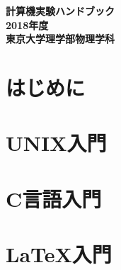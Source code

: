 \documentclass[a4j]{jsbook}
\newcommand{\nendo}{2018}
\begin{document}
\thispagestyle{empty}
\pagestyle{empty}
\begin{titlepage}
\vspace*{5cm}
\begin{center}
{\Huge\bf 計算機実験ハンドブック}\\
\vspace*{14cm}
{\LARGE\bf \nendo 年度}\\
\vspace{1.0cm}
{\LARGE\bf 東京大学理学部物理学科}
\end{center}
\end{titlepage}
\clearpage
\pagestyle{plain}
\cleardoublepage

\setcounter{page}{1}
\setcounter{tocdepth}{3}
\tableofcontents
\cleardoublepage

\chapter{はじめに}


\chapter{UNIX入門}


\chapter{C言語入門}


\chapter{\LaTeX 入門}


%


%
\end{document}
